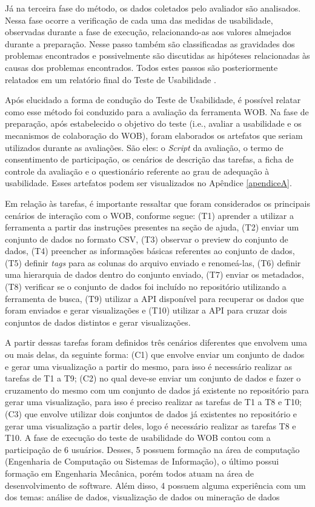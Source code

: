 Já na terceira fase do método, os dados coletados pelo avaliador são analisados. Nessa fase 
ocorre a verificação de cada uma das medidas de usabilidade, observadas durante a fase de 
execução, relacionando-as aos valores almejados durante a preparação. Nesse passo também 
são classificadas as gravidades dos problemas encontrados e possivelmente são discutidas as 
hipóteses relacionadas às causas dos problemas encontrados. Todos estes passos são 
posteriormente relatados em um relatório final do Teste de Usabilidade \cite{barbosa2010}.

Após elucidado a forma de condução do Teste de Usabilidade, é possível relatar como esse 
método foi conduzido para a avaliação da ferramenta WOB. Na fase de preparação, após 
estabelecido o objetivo do teste (i.e., avaliar a usabilidade e os mecanismos de 
colaboração do WOB), foram elaborados os artefatos que seriam utilizados durante as 
avaliações. São eles: o \textit{Script} da avaliação, o termo de consentimento de participação, 
os cenários de descrição das tarefas, a ficha de controle da avaliação e o questionário
referente ao grau de adequação à usabilidade. Esses artefatos podem ser visualizados no Apêndice \ref{apendiceA}.

Em relação às tarefas, é importante ressaltar que foram considerados os principais cenários de interação com o 
WOB, conforme segue: (T1) aprender a utilizar a ferramenta a partir das instruções presentes 
na seção de ajuda, (T2) enviar um conjunto de dados no formato CSV, (T3) observar o preview 
do conjunto de dados, (T4) preencher as informações básicas referentes ao conjunto de dados, 
(T5) definir \textit{tags} para as colunas do arquivo enviado e renomeá-las, (T6) definir uma 
hierarquia de dados dentro do conjunto enviado, (T7) enviar os metadados, (T8) 
verificar se o conjunto de dados foi incluído no repositório utilizando a 
ferramenta de busca, (T9) utilizar a API disponível para recuperar os dados que foram 
enviados e gerar visualizações e (T10) utilizar a API para cruzar dois conjuntos de 
dados distintos e gerar visualizações. 

A partir dessas tarefas foram definidos três cenários diferentes que envolvem uma ou mais 
delas, da seguinte forma: (C1) que envolve enviar um conjunto de dados e gerar uma 
visualização a partir do mesmo, para isso é necessário realizar as tarefas de T1 a T9; 
(C2) no qual deve-se enviar um conjunto de dados e fazer o cruzamento do mesmo com um 
conjunto de dados já existente no repositório para gerar uma visualização, para isso é 
preciso realizar as tarefas de T1 a T8 e T10; (C3) que envolve utilizar dois conjuntos de 
dados já existentes no repositório e gerar uma visualização a partir deles, logo é 
necessário realizar as tarefas T8 e T10. A fase de execução do teste de usabilidade do 
WOB contou com a participação de 6 usuários. Desses, 5 possuem formação na área de
computação (Engenharia de Computação ou Sistemas de Informação), o último possui 
formação em Engenharia Mecânica, porém todos atuam na área de desenvolvimento de software. 
Além disso, 4 possuem alguma experiência com um dos temas: análise de dados, visualização 
de dados ou mineração de dados

